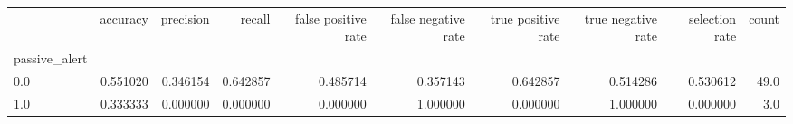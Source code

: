 \begin{tabular}{lrrrrrrrrr}
\toprule
{} &  accuracy &  precision &    recall &  false positive rate &  false negative rate &  true positive rate &  true negative rate &  selection rate &  count \\
passive\_alert &           &            &           &                      &                      &                     &                     &                 &        \\
\midrule
0.0           &  0.551020 &   0.346154 &  0.642857 &             0.485714 &             0.357143 &            0.642857 &            0.514286 &        0.530612 &   49.0 \\
1.0           &  0.333333 &   0.000000 &  0.000000 &             0.000000 &             1.000000 &            0.000000 &            1.000000 &        0.000000 &    3.0 \\
\bottomrule
\end{tabular}

